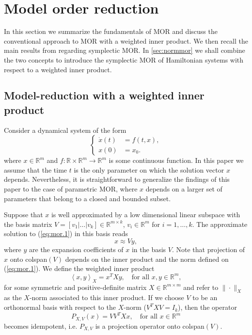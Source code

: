 \section{Model order reduction}
\label{sec:mor}

In this section we summarize the fundamentals of MOR and discuss the conventional approach to MOR with a weighted inner product. We then recall the main results from \cite{doi:10.1137/17M1111991} regarding symplectic MOR. In \cref{sec:normmor} we shall combine the two concepts to introduce the symplectic MOR of Hamiltonian systems with respect to a weighted inner product.

\subsection{Model-reduction with a weighted inner product} \label{sec:mor.1}
Consider a dynamical system of the form
\begin{equation} \label{eq:mor.1}
\left\{
\begin{aligned}
	\dot x(t) &= f(t,x), \\
	x(0) &= x_0.
\end{aligned}
\right.
\end{equation}
where $x\in \mathbb R^{m}$ and $f:\mathbb R \times \mathbb R^{m} \to \mathbb R^{m}$ is some continuous function. In this paper we assume that the time $t$ is the only parameter on which the solution vector $x$ depends. Nevertheless, it is straightforward to generalize the findings of this paper to the case of parametric MOR, where $x$ depends on a larger set of parameters that belong to a closed and bounded subset.

Suppose that $x$ is well approximated by a low dimensional linear subspace with the basis matrix $V=[v_1|\dots|v_k]\in \mathbb R^{m\times k}$, $v_i\in \mathbb R^{m}$ for $i=1,\dots,k$. The approximate solution to (\ref{eq:mor.1}) in this basis reads
\begin{equation} \label{eq:mor.2}
	x \approx Vy,
\end{equation}
where $y$ are the expansion coefficients of $x$ in the basis $V$. Note that projection of $x$ onto colspan$(V)$ depends on the inner product and the norm defined on (\ref{eq:mor.1}). We define the weighted inner product
\begin{equation} \label{eq:mor.3}
	\left\langle x,y \right\rangle_X = x^TXy,\quad \text{for all } x,y \in \mathbb R^m,
\end{equation}
for some symmetric and positive-definite matrix $X\in \mathbb{R}^{m\times m}$ and refer to $\|\cdot \|_X$ as the $X$-norm associated to this inner product. If we choose $V$ to be an orthonormal basis with respect to the $X$-norm ($V^TXV=I_k$), then the operator
\begin{equation} \label{eq:mor.4}
	P_{X,V}(x) = VV^TXx, \quad \text{for all } x\in \mathbb R^{m}
\end{equation}
becomes idempotent, i.e. $P_{X,V}$ is a projection operator onto colspan$(V)$.

